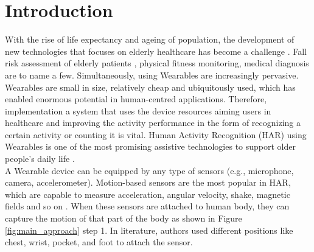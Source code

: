 \documentclass[journal,article,submit,moreauthors,pdftex]{Definitions/mdpi}
\begin{document}


\section{Introduction}

With the rise of life expectancy and ageing of population, the development of new technologies that focuses on elderly healthcare has become a challenge \cite{hong2008activity}. Fall risk assessment of elderly patients \cite{sow2013mining}, physical fitness monitoring\cite{morris2014recofit}, medical diagnosis \cite{gonzalez2015features} are to name a few. Simultaneously, using Wearables are increasingly pervasive. Wearables are small in size, relatively cheap and ubiquitously used, which has enabled enormous potential in human-centred applications. Therefore, implementation a system that uses the device resources aiming users in healthcare and improving the activity performance in the form of recognizing a certain activity or counting it \cite{schilit1994context} is vital. Human Activity Recognition (HAR) using Wearables is one of the most promising assistive technologies to support older people's daily life \cite{wang2019survey}.\\
A Wearable device can be equipped by any type of sensors (e.g., microphone, camera, accelerometer). Motion-based sensors are the most popular in HAR, which are capable to measure acceleration, angular velocity, shake, magnetic fields and so on \cite{hassan2018robust}. When these sensors are attached to human body, they can capture the motion of that part of the body as shown in Figure \ref{fig:main_approach} step 1. In literature\cite{morris2014recofit, s140610146,wang2019survey }, authors used different positions like chest, wrist, pocket, and foot to attach the sensor.
\end{document}
